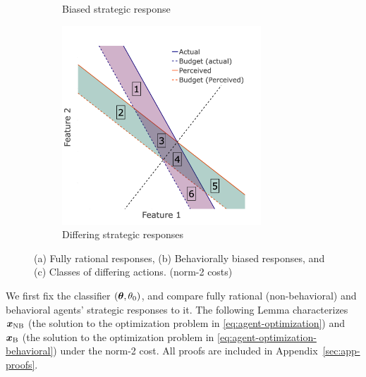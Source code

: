 \begin{figure}[t]
\begin{subfigure}[t]{0.3\textwidth}
        \caption{Biased strategic response}
        \label{fig:B-arrows}
    \end{subfigure}
    \hspace{0.01in}
    \begin{subfigure}[t]{0.3\textwidth}
        \includegraphics[width=0.82\textwidth]{Figures/B_highlighted_regions.png}
            \caption{Differing strategic responses}
        \label{fig:highlighted}
    \end{subfigure}
    \caption{(a) Fully rational responses, (b) Behaviorally biased responses, and (c) Classes of differing actions. (norm-2 costs)}
    \label{fig:BR-illustration}
\end{figure} 

We first fix the classifier $({\bm{\theta}}, \theta_0)$, and compare fully rational (non-behavioral) and behavioral agents' strategic responses to it. The following Lemma characterizes ${\bm{x}}_\text{NB}$ (the solution to the optimization problem in \eqref{eq:agent-optimization}) and ${\bm{x}}_\text{B}$ (the solution to the optimization problem in \eqref{eq:agent-optimization-behavioral}) under the norm-2 cost. All proofs are included in Appendix~\ref{sec:app-proofs}. 


